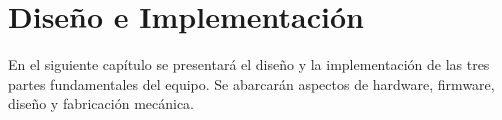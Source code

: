 
\chapter{Diseño e Implementación} %

\label{Chapter3} %
En el siguiente capítulo se presentará el diseño y la implementación de las tres partes fundamentales del equipo. Se abarcarán aspectos de hardware, firmware, diseño y fabricación mecánica.

